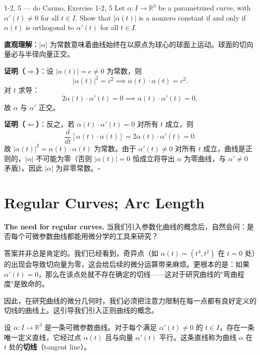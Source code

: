 \begin{exercise}{1-2, 5 — do Carmo, Exercise 1-2, 5}
Let $\alpha: I \to \mathbb{R}^3$ be a parametrized curve, with $\alpha'(t) \neq 0$ for all $t \in I$. Show that $|\alpha(t)|$ is a nonzero constant if and only if $\alpha(t)$ is orthogonal to $\alpha'(t)$ for all $t \in I$.
\end{exercise}

\begin{solution}
\textbf{直观理解}：$|\alpha|$ 为常数意味着曲线始终在以原点为球心的球面上运动。球面的切向量必与半径向量正交。

\textbf{证明（$\Rightarrow$）}：设 $|\alpha(t)| = c \neq 0$ 为常数，则
\[
|\alpha(t)|^2 = c^2 \implies \alpha(t) \cdot \alpha(t) = c^2.
\]
对 $t$ 求导：
\[
2\alpha(t) \cdot \alpha'(t) = 0 \implies \alpha(t) \cdot \alpha'(t) = 0,
\]
故 $\alpha$ 与 $\alpha'$ 正交。

\textbf{证明（$\Leftarrow$）}：反之，若 $\alpha(t) \cdot \alpha'(t) = 0$ 对所有 $t$ 成立，则
\[
\frac{d}{dt}[\alpha(t) \cdot \alpha(t)] = 2\alpha(t) \cdot \alpha'(t) = 0.
\]
故 $|\alpha(t)|^2 = \alpha(t) \cdot \alpha(t)$ 为常数。由于 $\alpha'(t) \neq 0$ 对所有 $t$ 成立，曲线是正则的，$|\alpha|$ 不可能为零（否则 $|\alpha(t)| = 0$ 恒成立将导出 $\alpha$ 为零曲线，与 $\alpha' \neq 0$ 矛盾）。因此 $|\alpha|$ 为非零常数。$\square$
\end{solution}

\section{Regular Curves; Arc Length}\label{sec:regular-arc-length}

\textbf{The need for regular curves.} 当我们引入参数化曲线的概念后，自然会问：是否每个可微参数曲线都能用微分学的工具来研究？

答案并非总是肯定的。我们已经看到，奇异点（如 $\alpha(t) = (t^3, t^2)$ 在 $t=0$ 处）的出现会导致切向量为零，这会给后续的微分运算带来麻烦。更根本的是：如果 $\alpha'(t) = 0$，那么在该点处就不存在确定的切线——这对于研究曲线的"弯曲程度"是致命的。

因此，在研究曲线的微分几何时，我们必须把注意力限制在每一点都有良好定义的切线的曲线上。这引导我们引入正则曲线的概念。

设 $\alpha: I \to \mathbb{R}^3$ 是一条可微参数曲线。对于每个满足 $\alpha'(t) \neq 0$ 的 $t \in I$，存在一条唯一定义直线，它经过点 $\alpha(t)$ 且与向量 $\alpha'(t)$ 平行。这条直线称为曲线 $\alpha$ 在 $t$ 处的\textbf{切线}（tangent line）。

